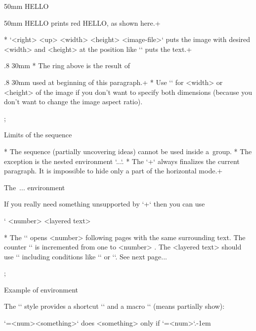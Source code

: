 \begtt
\puttext 0mm 50mm {\Red HELLO}
\endtt

  \puttext 0mm 50mm {\Red HELLO}
  prints red HELLO, as shown here.\pg+

* `\putpic <right> <up> <width> <height> {<image-file>}`
  puts the image with desired <width> and <height> at the position like
  `\puttext` puts the text.\pg+

  \putpic .8\hsize 20mm 30mm 
* The ring above is the result of

\begtt
\putpic .8\hsize 20mm 30mm 
\endtt
  used at beginning of this paragraph.\pg+
* Use `\nospec` for <width> or <height> of the image if you don't want to specify both
  dimensions (because you don't want to change the image aspect ratio).

\pg; %

\sec Limits of the \code{\\pg+} sequence

* The \code{\\pg+} sequence (partially uncovering ideas) cannot be used inside
  a~group.
* The exception is the nested environment `\begitems...\enditems`.
* The `\pg+` always finalizes the current paragraph.
  It is impossible to hide only a part of the horizontal mode.\pg+

\sec The \code{\\layers}\,...\code{\\endlayers} environment

If you really need something unsupported by `\pg+` then you can use

\begtt \catcode`
\layers <number>
<layered text>
\endlayers
\endtt

* The `\layers` opens <number> following pages with the same
  surrounding text. The counter `\layernum` is incremented from one to
  <number> . The <layered text> should use `\layernum` including
  conditions like `\ifnum\layernum` or `\ifcase\layernum`.
  See next page...

\pg; %

\sec Example of \code{\\layers} environment

The `\slides` style provides a shortcut `\use` and a macro `\pshow` (means
partially show):

\begtt
\def\use#1#2{\ifnum\layernum#1\relax#2\fi}
\def\pshow#1{\use{=#1}\Red \use{<#1}\Transparent \ignorespaces}
\endtt
`\use{=<num>}{<something>}` does <something> only if `\layernum=<num>`.\kern-1em

